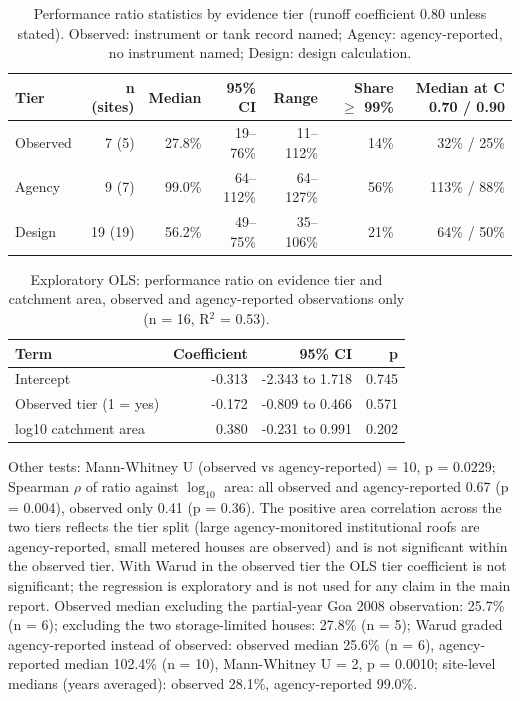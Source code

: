 
\begin{table}[H]\centering\small
\caption{Performance ratio statistics by evidence tier (runoff coefficient 0.80 unless stated). Observed: instrument or tank record named; Agency: agency-reported, no instrument named; Design: design calculation.}\label{tab:stats}
\begin{tabular}{lrrrrrr}\toprule
Tier & n (sites) & Median & 95\% CI & Range & Share $\geq$ 99\% & Median at C 0.70 / 0.90\\ \midrule
Observed & 7 (5) & 27.8\% & 19--76\% & 11--112\% & 14\% & 32\% / 25\%\\
Agency & 9 (7) & 99.0\% & 64--112\% & 64--127\% & 56\% & 113\% / 88\%\\
Design & 19 (19) & 56.2\% & 49--75\% & 35--106\% & 21\% & 64\% / 50\%\\
\bottomrule\end{tabular}
\end{table}

\begin{table}[H]\centering\small
\caption{Exploratory OLS: performance ratio on evidence tier and catchment area, observed and agency-reported observations only (n = 16, R$^2$ = 0.53).}\label{tab:ols}
\begin{tabular}{lrrr}\toprule
Term & Coefficient & 95\% CI & p\\ \midrule
Intercept & -0.313 & -2.343 to 1.718 & 0.745\\
Observed tier (1 = yes) & -0.172 & -0.809 to 0.466 & 0.571\\
log10 catchment area & 0.380 & -0.231 to 0.991 & 0.202\\
\bottomrule\end{tabular}
\end{table}
Other tests: Mann-Whitney U (observed vs agency-reported) = 10, p = 0.0229; Spearman $\rho$ of ratio against $\log_{10}$ area: all observed and agency-reported 0.67 (p = 0.004), observed only 0.41 (p = 0.36). The positive area correlation across the two tiers reflects the tier split (large agency-monitored institutional roofs are agency-reported, small metered houses are observed) and is not significant within the observed tier. With Warud in the observed tier the OLS tier coefficient is not significant; the regression is exploratory and is not used for any claim in the main report. Observed median excluding the partial-year Goa 2008 observation: 25.7\% (n = 6); excluding the two storage-limited houses: 27.8\% (n = 5); Warud graded agency-reported instead of observed: observed median 25.6\% (n = 6), agency-reported median 102.4\% (n = 10), Mann-Whitney U = 2, p = 0.0010; site-level medians (years averaged): observed 28.1\%, agency-reported 99.0\%.
